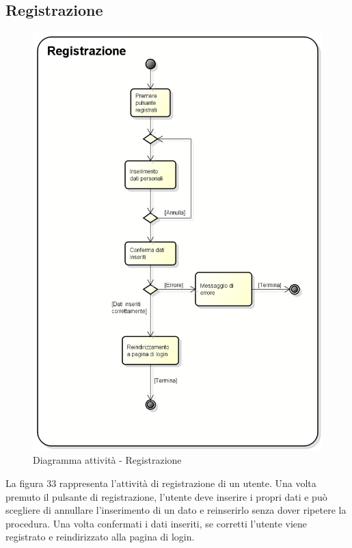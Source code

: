 \subsection{Registrazione}
\begin{figure}[h] 
	\centering 
	\includegraphics[scale=0.3] {img/activity_registrazione.png}
	\caption{Diagramma attività - Registrazione} 
\end{figure}
La figura 33 rappresenta l'attività di registrazione di un utente. Una volta premuto il pulsante di registrazione, l'utente deve inserire i propri dati e può scegliere di annullare l'inserimento di un dato e reinserirlo senza dover ripetere la procedura. Una volta confermati i dati inseriti, se corretti l'utente viene registrato e reindirizzato alla pagina di login.
\newpage


